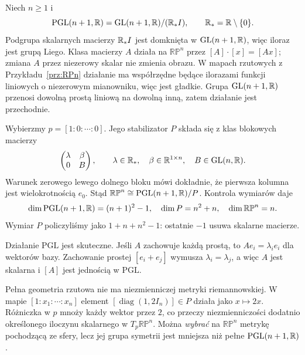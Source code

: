 \begin{przyklad}
\label{prz:klein-rzutowa}
Niech $n\geq1$ i
\[
 \mathrm{PGL}(n+1,\mathbb{R})
 =\mathrm{GL}(n+1,\mathbb{R})/(\mathbb{R}_*I),
 \qquad \mathbb{R}_*=\mathbb{R}\setminus\{0\}.
\]
Podgrupa skalarnych macierzy $\mathbb{R}_*I$ jest domknięta
w $\mathrm{GL}(n+1,\mathbb{R})$, więc iloraz jest grupą Liego.
Klasa macierzy $A$ działa na $\mathbb{RP}^n$ przez
$[A]\cdot[x]=[Ax]$; zmiana $A$ przez niezerowy skalar
nie zmienia obrazu. W mapach rzutowych z
Przykładu~\ref{prz:RPn} działanie ma współrzędne będące
ilorazami funkcji liniowych o niezerowym mianowniku,
więc jest gładkie. Grupa $\mathrm{GL}(n+1,\mathbb{R})$ przenosi
dowolną prostą liniową na dowolną inną, zatem działanie
jest przechodnie.

Wybierzmy $p=[1:0:\cdots:0]$. Jego stabilizator $P$
składa się z klas blokowych macierzy
\[
 \begin{pmatrix}\lambda&\beta\\0&B\end{pmatrix},
 \qquad \lambda\in\mathbb{R}_*,\quad
 \beta\in\mathbb{R}^{1\times n},\quad B\in\mathrm{GL}(n,\mathbb{R}).
\]
Warunek zerowego lewego dolnego bloku mówi dokładnie,
że pierwsza kolumna jest wielokrotnością $e_0$.
Stąd $\mathbb{RP}^n\cong\mathrm{PGL}(n+1,\mathbb{R})/P$.
Kontrola wymiarów daje
\[
 \dim\mathrm{PGL}(n+1,\mathbb{R})=(n+1)^2-1,
 \quad \dim P=n^2+n,
 \quad \dim\mathbb{RP}^n=n.
\]
Wymiar $P$ policzyliśmy jako
$1+n+n^2-1$: ostatnie $-1$ usuwa skalarne macierze.

Działanie $\mathrm{PGL}$ jest skuteczne. Jeśli $A$ zachowuje
każdą prostą, to $Ae_i=\lambda_i e_i$ dla wektorów bazy.
Zachowanie prostej $[e_i+e_j]$ wymusza
$\lambda_i=\lambda_j$, a więc $A$ jest skalarna i
$[A]$ jest jednością w $\mathrm{PGL}$.

Pełna geometria rzutowa nie ma niezmienniczej metryki
riemannowskiej. W mapie $[1:x_1:\cdots:x_n]$ element
$[\operatorname{diag}(1,2I_n)]\in P$ działa jako
$x\mapsto2x$. Różniczka w $p$ mnoży każdy wektor przez
$2$, co przeczy niezmienniczości dodatnio określonego
iloczynu skalarnego w $T_p\mathbb{RP}^n$. Można
\emph{wybrać} na $\mathbb{RP}^n$ metrykę pochodzącą ze
sfery, lecz jej grupa symetrii jest mniejsza niż pełne
$\mathrm{PGL}(n+1,\mathbb{R})$.
\end{przyklad}

